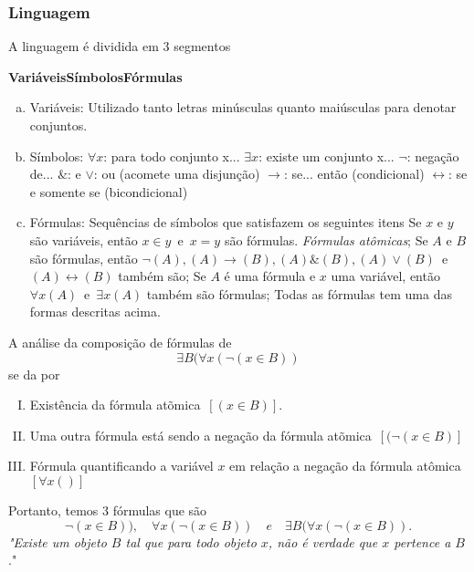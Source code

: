       \subsubsection{Linguagem}
         A linguagem é dividida em 3 segmentos
         \begin{center}
            \textbf{Variáveis}\quad \textbf{Símbolos}\quad \textbf{Fórmulas} 
         \end{center}
         \begin{enumerate}[a)]
            \item Variáveis: Utilizado tanto letras minúsculas quanto maiúsculas para denotar conjuntos.
            \item Símbolos:  
               \subitem $\forall x$: para todo conjunto x...
               \subitem $\exists x$: existe um conjunto x...
               \subitem $\neg$: negação de...
               \subitem $\&$: e
               \subitem $\lor$: ou (acomete uma disjunção)
               \subitem $\rightarrow$: se... então (condicional)
               \subitem $\leftrightarrow$: se e somente se (bicondicional)
            \item Fórmulas: Sequências de símbolos que satisfazem os seguintes itens
               \subitem Se $x$ e $y$ são variáveis, então $x \in y$\ e\ $x = y$ são fórmulas. \emph{Fórmulas atômicas};
               \subitem Se $A$ e $B$ são fórmulas, então $\neg(A), (A) \rightarrow (B), (A) \& (B), (A) \lor (B)$\ e\ $(A) \leftrightarrow (B)$ também são;
               \subitem Se $A$ é uma fórmula e $x$ uma variável, então $\forall x(A)$\ e\ $\exists x(A)$ também são fórmulas;
               \subitem Todas as fórmulas tem uma das formas descritas acima.
         \end{enumerate}
         \begin{exmp}
            A análise da composição de fórmulas de
            $$\exists B(\forall x(\neg(x \in B))$$
            se da por
            \begin{enumerate}[I.]
               \item Existência da fórmula atõmica\ $[(x \in B)]$.
               \item Uma outra fórmula está sendo a negação da fórmula atõmica\ $[(\neg(x \in B)]$
               \item Fórmula quantificando a variável $x$ em relação a negação da fórmula atômica\ $[\forall x()]$
            \end{enumerate}
            Portanto, temos 3 fórmulas que são $$\neg(x \in B)),\quad \forall x(\neg(x \in B)) \quad e\quad \exists B (\forall x(\neg(x \in B)).$$
            \emph{"Existe um objeto $B$ tal que para todo objeto $x$, não é verdade que $x$ pertence a $B$}."
         \end{exmp}
